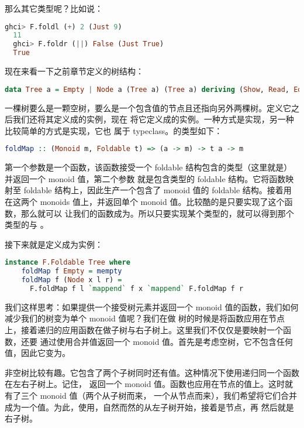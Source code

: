 \documentclass[./main.tex]{subfiles}
\begin{document}
那么其它类型呢？比如说：

\begin{lstlisting}[language=Haskell]
  ghci> F.foldl (+) 2 (Just 9)
  11
  ghci> F.foldr (||) False (Just True)
  True
\end{lstlisting}

现在来看一下之前章节定义的树结构：

\begin{lstlisting}[language=Haskell]
  data Tree a = Empty | Node a (Tree a) (Tree a) deriving (Show, Read, Eq)
\end{lstlisting}

一棵树要么是一颗空树，要么是一个包含值的节点且还指向另外两棵树。定义它之后我们还将其定义成的实例，现在
将它定义成的实例。一种方式是实现，另一种比较简单的方式是实现，它也
属于 typeclass。的类型如下：

\begin{lstlisting}[language=Haskell]
  foldMap :: (Monoid m, Foldable t) => (a -> m) -> t a -> m
\end{lstlisting}

第一个参数是一个函数，该函数接受一个 foldable 结构包含的类型（这里就是）并返回一个 monoid 值，第二个参数
就是包含类型的 foldable 结构。它将函数映射至 foldable 结构上，因此生产一个包含了 monoid 值的 foldable
结构。接着用在这两个 monoids 值上，并返回单个 monoid 值。比较酷的是只要实现了这个函数，那么就可以
让我们的函数成为。所以只要实现某个类型的，就可以得到那个类型的与
。

接下来就是定义成为实例：

\begin{lstlisting}[language=Haskell]
  instance F.Foldable Tree where
    foldMap f Empty = mempty
    foldMap f (Node x l r) =
      F.foldMap f l `mappend` f x `mappend` F.foldMap f r
\end{lstlisting}

我们这样思考：如果提供一个接受树元素并返回一个 monoid 值的函数，我们如何减少我们的树变为单个 monoid 值呢？我们在做
树的时候是将函数应用在节点上，接着递归的应用函数在做子树与右子树上。这里我们不仅仅是要映射一个函数，还要
通过使用合并值返回一个 monoid 值。首先是考虑空树，它不包含任何值，因此它变为。

非空树比较有趣。它包含了两个子树同时还有值。这种情况下使用递归同一个函数在左右子树上。记住，
返回一个 monoid 值。函数也应用在节点的值上。这时就有了三个 monoid 值（两个从子树而来，
一个从节点而来），我们希望将它们合并成为一个值。为此，使用，自然而然的从左子树开始，接着是节点，再
然后就是右子树。
\end{document}
